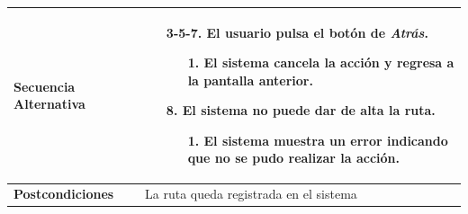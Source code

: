 \begin{longtable}{| p{4cm} | p{10cm} |}
\hline
\textbf{Secuencia Alternativa} &\mbox{}\par\vspace{-\baselineskip}
\begin{enumerate}[leftmargin=1.2cm, topsep=0.1cm]
\item[3-5-7.] El usuario pulsa el botón de \textit{Atrás}.
	\begin{itemize}
	\item[1.] El sistema cancela la acción y regresa a la pantalla anterior.
	\end{itemize}
\item[8.] El sistema no puede dar de alta la ruta.
	\begin{itemize}
	\item[1.] El sistema muestra un error indicando que no se pudo realizar la acción.
	\end{itemize}
\end{enumerate}


\\

\hline
\textbf{Postcondiciones} & 
La ruta queda registrada en el sistema\\
\hline
\end{longtable}




\newpage
